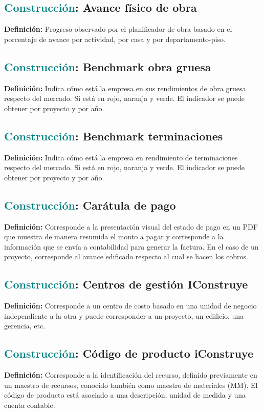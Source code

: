 \documentclass[12pt]{article}
\begin{document}
\subsection{\textcolor{teal}{Construcción}: Avance físico de obra}
\textbf{Definición:} Progreso observado por el planificador de obra basado en el porcentaje de avance por actividad, por casa y por departamento-piso.
\subsection{\textcolor{teal}{Construcción}: Benchmark obra gruesa}
\textbf{Definición:} Indica cómo está la empresa en sus rendimientos de obra gruesa respecto del mercado. Si está en rojo, naranja y verde. El indicador se puede obtener por proyecto y por año.
\subsection{\textcolor{teal}{Construcción}: Benchmark terminaciones}
\textbf{Definición:} Indica cómo está la empresa en rendimiento de terminaciones respecto del mercado. Si está en rojo, naranja y verde. El indicador se puede obtener por proyecto y por año.
\subsection{\textcolor{teal}{Construcción}: Carátula de pago}
\textbf{Definición:} Corresponde a la presentación visual del estado de pago en un PDF que muestra de manera resumida el monto a pagar y corresponde a la información que se envía a contabilidad para generar la factura. En el caso de un proyecto, corresponde al avance edificado respecto al cual se hacen los cobros.
\subsection{\textcolor{teal}{Construcción}: Centros de gestión IConstruye}
\textbf{Definición:} Corresponde a un centro de costo basado en una unidad de negocio independiente a la otra y puede corresponder a un proyecto, un edificio, una gerencia, etc.
\subsection{\textcolor{teal}{Construcción}: Código de producto iConstruye}
\textbf{Definición:} Corresponde a la identificación del recurso, definido previamente en un maestro de recursos, conocido también como maestro de materiales (MM). El código de producto está asociado a una descripción, unidad de medida y una cuenta contable.
\end{document}
